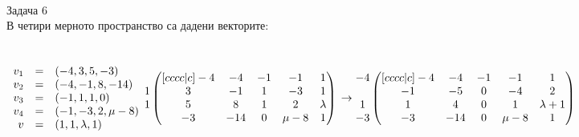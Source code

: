 \documentclass{article}
\begin{document}
    \\
    Задача 6\\
    В четири мерното пространство са дадени векторите:\\
    \\
    \\
    \begin{math}
        \begin{array}{rcl}
            v_1 & = & (-4, 3, 5, -3)\\
            v_2 & = & (-4, -1, 8, -14)\\
            v_3 & = & (-1, 1, 1, 0)\\
            v_4 & = & (-1, -3, 2,\mu - 8)\\
            v & = & (1, 1, \lambda, 1)
        \end{array}\\
        \\
        \\
        \begin{matrix}
          ~\\
          1\\
          1\\
          ~
        \end{matrix}
        \begin{pmatrix}[cccc|c]
             -4 & -4 & -1 & -1 & 1\\
             3 & -1 & 1 & -3 & 1\\
             5 & 8 & 1 & 2 & \lambda\\
             -3 & -14 & 0 & \mu - 8 & 1
        \end{pmatrix}\\
        \\
        \\
        \to
        \begin{matrix}
          -4\\
          ~\\
          1\\
          -3
        \end{matrix}
        \begin{pmatrix}[cccc|c]
             -4 & -4 & -1 & -1 & 1\\
             -1 & -5 & 0 & -4 & 2\\
             1 & 4 & 0 & 1 & \lambda + 1\\
             -3 & -14 & 0 & \mu - 8 & 1
        \end{pmatrix}
        \\

\end{math}
\end{document}
